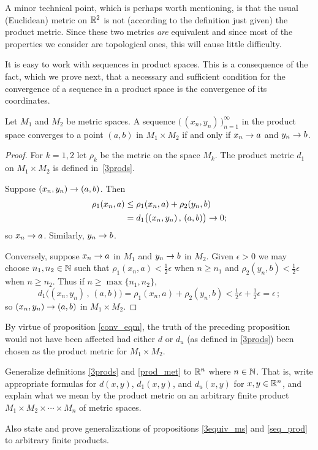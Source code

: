 A minor technical point, which is perhaps worth mentioning, is that the usual (Euclidean)
metric on $\mathbb{R}^2$ is not (according to the definition just given) the product metric. Since
these two metrics \emph{are} equivalent and since most of the properties we consider are
topological ones, this will cause little difficulty.

It is easy to work with sequences in product spaces. This is a consequence of the fact, which
we prove next, that a necessary and sufficient condition for the convergence of a sequence in
a product space is the convergence of its coordinates.

\begin{prop}\label{seq_prod} Let $M_1$ and $M_2$ be metric spaces.  A sequence
$\bigl(\,(x_n,y_n)\,\bigr)_{n=1}^{\infty}$ in the product space converges to a point $(a,b)$
in $M_1 \times M_2$ if and only if $x_n \rightarrow a$ and $y_n \rightarrow b$.
\end{prop}

\begin{proof} For $k=1,2$ let $\rho_k$ be the metric on the space $M_k$. The product metric
$d_1$ on $M_1 \times M_2$ is defined in~\ref{3prods}.

Suppose $(x_n,y_n) \rightarrow (a,b)$. Then
 \begin{align*}
     \rho_1(x_n,a) &\le \rho_1(x_n,a) + \rho_2(y_n,b) \\
                   &= d_1\bigl((x_n,y_n)\,,\,(a,b)\bigr) \rightarrow 0;
 \end{align*}
so $x_n \rightarrow a$. Similarly, $y_n \rightarrow b$.

Conversely, suppose $x_n \rightarrow a$ in $M_1$ and $y_n \rightarrow b$ in $M_2$. Given $\epsilon > 0$ we
may choose $n_1,n_2 \in \mathbb{N}$ such that $\rho_1(x_n,a) < \frac12\epsilon$ when $n \ge n_1$ and
$\rho_2(y_n,b) < \frac12\epsilon$ when $n \ge n_2$. Thus if $n \ge \max\{n_1,n_2\}$,
   \[ d_1\bigl((x_n,y_n)\,,\,(a,b)\bigr)
                       = \rho_1(x_n,a) + \rho_2(y_n,b)
                 < \tfrac12\epsilon + \tfrac12\epsilon = \epsilon\,; \]
so $(x_n,y_n) \rightarrow (a,b)$ in $M_1 \times M_2$.
\end{proof}

\begin{rem}  By virtue of proposition \ref{conv_eqm}, the truth of the preceding proposition
would not have been affected had either $d$ or $d_u$ (as defined in \ref{3prods}) been chosen
as the product metric for $M_1 \times M_2$.
\end{rem}

\begin{prob} Generalize definitions \ref{3prods} and \ref{prod_met} to $\mathbb{R}^n$ where $n \in \mathbb{N}$.
That is, write appropriate formulas for $d(x,y)$, $d_1(x,y)$, and $d_u(x,y)$ for $x,y \in
\mathbb{R}^n$, and explain what we mean by the product metric on an arbitrary finite product $M_1
\times M_2 \times \cdots \times M_n$ of metric spaces.

Also state and prove generalizations of propositions \ref{3equiv_ms} and \ref{seq_prod} to
arbitrary finite products.
\end{prob}
